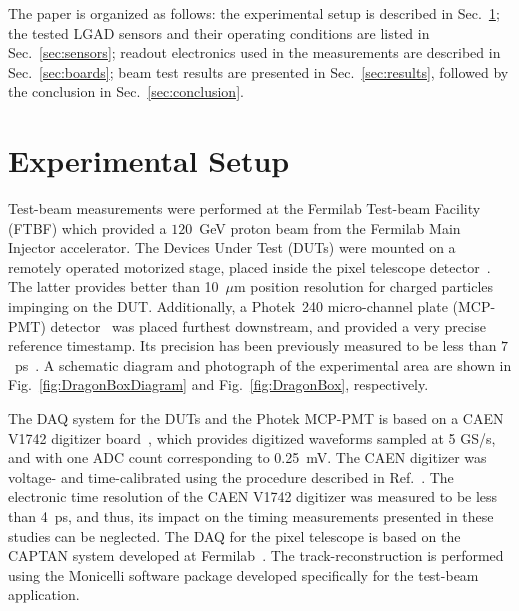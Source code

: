 \documentclass[preprint,1p]{elsarticle}
\begin{document}
The paper is organized as follows: the experimental setup is described in
Sec.~\ref{sec:setup}; the tested LGAD sensors and their operating conditions are
listed in Sec.~\ref{sec:sensors}; readout electronics used in the measurements are 
described in Sec.~\ref{sec:boards}; beam test results are presented in 
Sec.~\ref{sec:results}, followed by the conclusion in Sec.~\ref{sec:conclusion}.

\section{Experimental Setup} 
\label{sec:setup}


Test-beam measurements were performed at the Fermilab Test-beam Facility (FTBF)
which provided a $120$~GeV proton beam from the Fermilab Main Injector
accelerator. The Devices Under Test (DUTs) were mounted on a remotely operated
motorized stage, placed inside the pixel telescope detector~\cite{KWAN2016162}.
The latter provides better than 10~$\mu$m position resolution for charged
particles impinging on the DUT. Additionally, a Photek~240 micro-channel plate
(MCP-PMT) detector~\cite{Anderson:2015gha, MCPFastCaloNIMA,
Ronzhin2015288,Ronzhin201552} was placed furthest downstream, and provided a
very precise reference timestamp. Its precision has been previously
measured to be less than $7$~ps~\cite{Ronzhin2015288}. A schematic diagram and
photograph of the experimental area are shown in Fig.~\ref{fig:DragonBoxDiagram}
and Fig.~\ref{fig:DragonBox}, respectively. 

The DAQ system for the DUTs and the Photek MCP-PMT is based on a CAEN V1742
digitizer board~\cite{CAENDRS}, which provides digitized waveforms sampled at 5
GS/s, and with one ADC count corresponding to 0.25~mV. The CAEN digitizer was
voltage- and time-calibrated using the procedure described in
Ref.~\cite{Kim201467}. The electronic time resolution of the CAEN V1742
digitizer was measured to be less than 4~ps, and thus, its impact on the timing
measurements presented in these studies can be neglected. The DAQ for the pixel
telescope is based on the CAPTAN system developed at
Fermilab~\cite{KWAN2016162}. The track-reconstruction is performed using the
Monicelli software package developed specifically for the test-beam application. 
\end{document}
